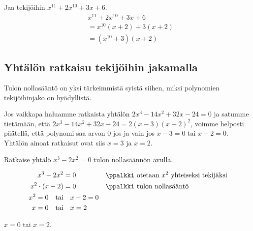 \begin{esimerkki}
Jaa tekijöihin $x^{11}+2x^{10}+3x+6$.
\begin{align*}
& x^{11}+2x^{10}+3x+6\\
& =x^{10}(x+2)+3(x+2)\\
&=(x^{10}+3)(x+2)
\end{align*}
\end{esimerkki}

\subsection{Yhtälön ratkaisu tekijöihin jakamalla}

Tulon nollasääntö on yksi tärkeimmistä syistä siihen, miksi polynomien tekijöihinjako on hyödyllistä.

Jos vaikkapa haluamme ratkaista yhtälön $2x^3-14x^2+32x-24=0$ ja satumme tietämään, että $2x^3-14x^2+32x-24=2(x-3)(x-2)^2$, voimme helposti päätellä, että polynomi saa arvon $0$ jos ja vain jos $x-3=0$ tai $x-2=0$. Yhtälön ainoat ratkaisut ovat siis $x=3$ ja $x=2$.

\begin{esimerkki}
Ratkaise yhtälö $x^3-2x^2=0$ tulon nollasäännön avulla.
\begin{esimratk}
\begin{align*}
x^3-2x^2 &= 0 && \ppalkki \text{ otetaan } x^2 \text{ yhteiseksi tekijäksi} \\
x^2\cdot(x-2) &= 0 && \ppalkki \text{ tulon nollasääntö} \\
x^2=0 \textrm{\quad tai}& \quad x-2=0 \\
x=0 \textrm{\quad tai}& \quad x=2 \\
\end{align*}
\end{esimratk}
\begin{esimvast}
$x=0$ tai $x=2$.
\end{esimvast}
\end{esimerkki}


